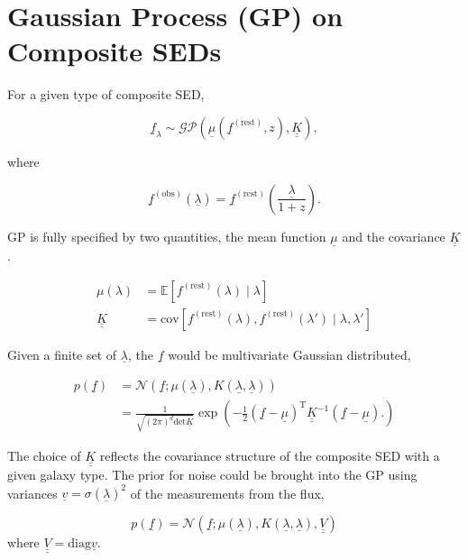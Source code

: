 \documentclass[12pt,letterpaper]{article}
\newcommand{\q}{\underline}
\newcommand{\mt}{\mathrm}
\begin{document}
\section*{Gaussian Process (GP) on Composite SEDs}

For a given type of composite SED,

\begin{equation}
    \q f_\lambda \sim \mathcal{GP}( \q \mu( \q f^{\mt{(rest)}}, z ), \q {\q K} ),
\end{equation}

where

\begin{equation*}
    \q f^{\mt{(obs)}}(\q \lambda) = \q f^{\mt{(rest)}}(\frac{\q \lambda}{1 + z}).
\end{equation*}

GP is fully specified by two quantities, the mean function $\q \mu$ and the covariance $\q{\q K}$.

\begin{equation}
    \begin{split}
        \mu(\lambda) &= \mathbb{E} [ f^{\mt{(rest)}}(\lambda) \mid \lambda ]\\
        \q{\q K}     &= \mt{cov}[  f^{\mt{(rest)}}(\lambda), f^{\mt{(rest)}}(\lambda') 
            \mid \lambda, \lambda' ]
    \end{split}
\end{equation}

Given a finite set of $\q \lambda$, the $\q f$ would be multivariate Gaussian distributed,

\begin{equation*}
    \begin{split}
        p(\q f) &= \mathcal{N}( \q f; \mu(\q \lambda), K(\q \lambda, \q \lambda) )\\
                &= \frac{1}{\sqrt{ (2\pi)^d \mt{det} \q{\q K} }}
                    \exp{ \left (   -\frac{1}{2} (\q f - \q \mu)^{\mt T} \q{\q K}^{-1} (\q f - \q \mu).  \right ) }
    \end{split}
\end{equation*}


The choice of $\q{\q K}$ reflects the covariance structure of the composite SED 
with a given galaxy type.
The prior for noise could be brought into the GP using variances $\q v = \sigma(\q \lambda)^2$ of the measurements 
from the flux,

\begin{equation*}
    p(\q f) = \mathcal{N}(\q f; \mu(\q \lambda), K(\q \lambda, \q \lambda), \q{\q V})
\end{equation*}
where $\q{\q V} = \mt{diag} \q v$.
\end{document}
